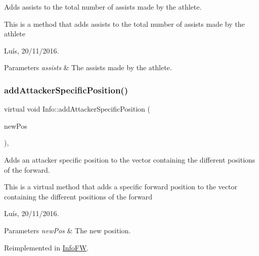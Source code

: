 Adds assists to the total number of assists made by the athlete. 

This is a method that adds assists to the total number of assists made by the athlete

Luís, 20/11/2016. 


\begin{DoxyParams}{Parameters}
{\em assists} & The assists made by the athlete. \\
\hline
\end{DoxyParams}
\hypertarget{class_info_afba094a1c19e8ff4bb3a9048ca6c7f4a}{}\label{class_info_afba094a1c19e8ff4bb3a9048ca6c7f4a} 
\subsubsection{\texorpdfstring{add\+Attacker\+Specific\+Position()}{addAttackerSpecificPosition()}}
{\footnotesize\ttfamily virtual void Info\+::add\+Attacker\+Specific\+Position (\begin{DoxyParamCaption}\item[{\hyperlink{_utils_8hpp_ae6ffae6f01bd3312aac4a44642f14620}{Forward\+Position}}]{new\+Pos }\end{DoxyParamCaption})\hspace{0.3cm}{\ttfamily [inline]}, {\ttfamily [virtual]}}



Adds an attacker specific position to the vector containing the different positions of the forward. 

This is a virtual method that adds a specific forward position to the vector containing the different positions of the forward

Luís, 20/11/2016. 


\begin{DoxyParams}{Parameters}
{\em new\+Pos} & The new position. \\
\hline
\end{DoxyParams}


Reimplemented in \hyperlink{class_info_f_w_af8af688ba3e796239736dd9ce450991f}{Info\+FW}.

\hypertarget{class_info_a33d98f07e5a276f9a3d0a08275f559b3}{}\label{class_info_a33d98f07e5a276f9a3d0a08275f559b3} 
